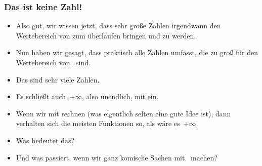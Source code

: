 \documentclass[aspectratio=169,mathserif,notheorems]{beamer}%
\begin{document}
%
\begin{frame}%
\frametitle{Das ist keine Zahl!}%
\begin{itemize}%
\item Also gut, wir wissen jetzt, dass sehr große Zahlen irgendwann den Wertebereich von  zum überlaufen bringen und zu  werden.%
\item<2-> Nun haben wir gesagt, dass  praktisch alle Zahlen umfasst, die zu groß für den Wertebereich von~ sind.%
\item<3-> Das sind sehr viele Zahlen.%
\item<4-> Es schließt auch~$+\infty$, also unendlich, mit ein.%
\item<5-> Wenn wir mit  rechnen (was eigentlich selten eine gute Idee ist), dann verhalten sich die meisten Funktionen so, als wäre es~$+\infty$.%
\item<6-> Was bedeutet das?%
\item<7-> Und was passiert, wenn wir ganz komische Sachen mit~ machen?%
\end{itemize}%
\end{frame}%
%
\end{document}
